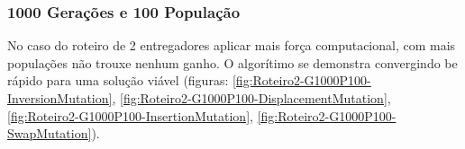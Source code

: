 \subsubsection{1000 Gerações e 100 População}

No caso do roteiro de 2 entregadores aplicar mais força computacional, com mais populações não trouxe nenhum ganho. O algorítimo se demonstra convergindo be rápido para uma solução viável (figuras: \ref{fig:Roteiro2-G1000P100-InversionMutation}, \ref{fig:Roteiro2-G1000P100-DisplacementMutation}, \ref{fig:Roteiro2-G1000P100-InsertionMutation}, \ref{fig:Roteiro2-G1000P100-SwapMutation}).

\begin{center}
	\label{fig:Roteiro2-G1000P100-DisplacementMutation}
\end{center}
